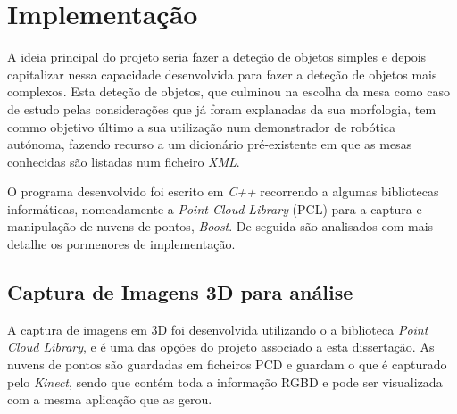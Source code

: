 \chapter{Implementação}\label{chap:chap4}



A ideia principal do projeto seria fazer a deteção de objetos simples e depois capitalizar nessa capacidade desenvolvida para fazer a deteção de objetos mais complexos. Esta deteção de objetos, que culminou na escolha da mesa como caso de estudo pelas considerações que já foram explanadas da sua morfologia, tem commo objetivo último a sua utilização num demonstrador de robótica autónoma, fazendo recurso a um dicionário pré-existente em que as mesas conhecidas são listadas num ficheiro \emph{XML}.

O programa desenvolvido foi escrito em \emph{C++} recorrendo a algumas bibliotecas informáticas, nomeadamente a \emph{Point Cloud Library} (PCL) para a captura e manipulação de nuvens de pontos, \emph{Boost}. De seguida são analisados com mais detalhe os pormenores de implementação.

\section{Captura de Imagens 3D para análise }

A captura de imagens em 3D foi desenvolvida utilizando o a biblioteca \emph{Point Cloud Library}, e é uma das opções do projeto associado a esta dissertação. As nuvens de pontos são guardadas em ficheiros PCD e guardam o que é capturado pelo \emph{Kinect}, sendo que contém toda a informação RGBD e pode ser visualizada com a mesma aplicação que as gerou.

